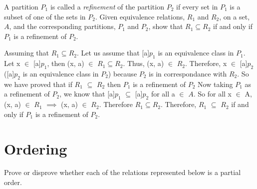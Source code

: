 \documentclass[addpoints]{exam}
\begin{document}
\begin{questions}
\question[5] A partition $P_1$ is called a \textit{refinement} of the partition $P_2$ if every set in $P_1$ is a subset of one of the sets in $P_2$. Given equivalence relations, $R_1$ and $R_2$, on a set, $A$, and the corresponding partitions, $P_1$ and $P_2$, show that $R_1 \subseteq R_2$ if and only if $P_1$ is a refinement of $P_2$.
  \begin{solution}
    Assuming that $R_1 \subseteq R_2$. \newline Let us assume that [a]$p_1$ is an equivalence class in $P_1$. \newline 
    Let x $\in$ [a]$p_1$, then (x, a) $\in$ $R_1 \subseteq R_2$. \newline
    Thus, (x, a) $\in$ $R_2$. Therefore, x $\in$ [a]$p_2$ ([a]$p_2$ is an equivalence class in $P_2$) because $P_2$ is in correspondance with $R_2$. \newline
    So we have proved that if $R_1$ $\subseteq$ $R_2$ then $P_1$ is a refinement of $P_2$ \newline
    Now taking $P_1$ as a refinement of $P_2$, we know that [a]$p_1$ $\subseteq$ [a]$p_2$ for all a $\in$ $A$. \newline 
    So for all x $\in$ A, (x, a) $\in$ $R_1$ $\implies$ (x, a) $\in$ $R_2$. Therefore  $R_1 \subseteq R_2$. \newline
    Therefore, $R_1$ $\subseteq$ $R_2$ if and only if $P_1$ is a refinement of $P_2$.
     
  \end{solution}

  \section{Ordering}
  
\question Prove or disprove whether each of the relations represented below is a partial order.
  \begin{multicols}{3}
  \end{multicols}
  \begin{solution}
    \begin{parts}

\end{parts}
\end{solution}
\end{questions}
\end{document}
